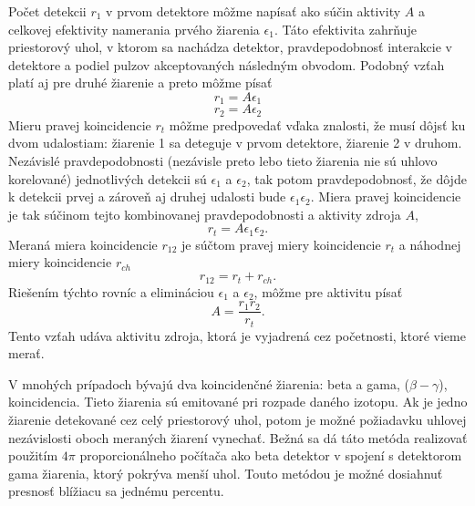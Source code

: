\documentclass[../../main.tex]{subfiles}
\begin{document}
Počet detekcii $r_1$ v prvom detektore môžme napísať ako súčin aktivity $A$ a celkovej efektivity namerania prvého žiarenia $\epsilon_1$. Táto efektivita zahrňuje priestorový uhol, v ktorom sa nachádza detektor, pravdepodobnosť interakcie v detektore a podiel pulzov akceptovaných následným obvodom. Podobný vzťah platí aj pre druhé žiarenie a preto môžme písať
$$ r_1 = A \epsilon_1 $$ 
$$ r_2 = A \epsilon_2 $$
Mieru pravej koincidencie $r_t$ môžme predpovedať vďaka znalosti, že musí dôjsť ku dvom udalostiam: žiarenie 1 sa deteguje v prvom detektore, žiarenie 2 v druhom. Nezávislé pravdepodobnosti (nezávisle preto lebo tieto žiarenia nie sú uhlovo korelované) jednotlivých detekcii sú $\epsilon_1$ a $\epsilon_2$, tak potom pravdepodobnosť, že dôjde k detekcii prvej a zároveň aj druhej udalosti bude $\epsilon_1 \epsilon_2$. Miera pravej koincidencie je tak súčinom tejto kombinovanej pravdepodobnosti a aktivity zdroja $A$,
$$ r_t = A \epsilon_1 \epsilon_2.$$
Meraná miera koincidencie $r_{12}$ je súčtom pravej miery koincidencie $r_t$ a náhodnej miery koincidencie $r_{ch}$
$$ r_{12} = r_t + r_{ch}.$$
Riešením týchto rovníc a elimináciou $\epsilon_1$ a $\epsilon_2$, môžme pre aktivitu písať 
$$ A = \frac{r_1 r_2}{r_t}.$$
Tento vzťah udáva aktivitu zdroja, ktorá je vyjadrená cez početnosti, ktoré vieme merať.

V mnohých prípadoch bývajú dva koincidenčné žiarenia: beta a gama, ($\beta-\gamma$), koincidencia. Tieto žiarenia sú emitované pri rozpade daného izotopu. Ak je jedno žiarenie detekované cez celý priestorový uhol, potom je možné požiadavku uhlovej nezávislosti oboch meraných žiarení vynechať. Bežná sa dá táto metóda realizovať použitím $4\pi$ proporcionálneho počítača ako beta detektor v spojení s detektorom gama žiarenia, ktorý pokrýva menší uhol. Touto metódou je možné dosiahnuť presnosť blížiacu sa jednému percentu.
\end{document}
